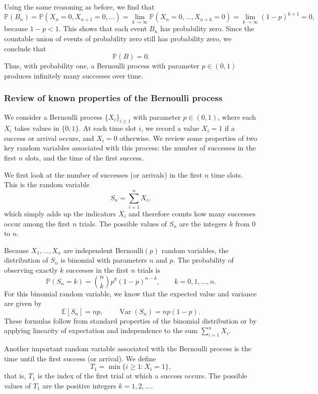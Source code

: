 Using the same reasoning as before, we find that
\[
\mathbb{P}(B_n)
=
\mathbb{P}(X_n = 0, X_{n+1} = 0, \ldots)
=
\lim_{k \to \infty} \mathbb{P}(X_n = 0, \ldots, X_{n+k} = 0)
=
\lim_{k \to \infty} (1-p)^{k+1}
=
0,
\]
because \(1-p < 1\).  
This shows that each event \(B_n\) has probability zero.  
Since the countable union of events of probability zero still has probability zero, we conclude that
\[
\mathbb{P}(B) = 0.
\]
Thus, with probability one, a Bernoulli process with parameter \(p \in (0,1)\) produces infinitely many successes over time.

\subsubsection{Review of known properties of the Bernoulli process}

We consider a Bernoulli process \(\{X_i\}_{i \geq 1}\) with parameter \(p \in (0,1)\), where each \(X_i\) takes values in \(\{0,1\}\).  
At each time slot \(i\), we record a value \(X_i = 1\) if a success or arrival occurs, and \(X_i = 0\) otherwise.  
We review some properties of two key random variables associated with this process: the number of successes in the first \(n\) slots, and the time of the first success.  

We first look at the number of successes (or arrivals) in the first \(n\) time slots.  
This is the random variable
\[
S_n = \sum_{i=1}^{n} X_i,
\]
which simply adds up the indicators \(X_i\) and therefore counts how many successes occur among the first \(n\) trials.  
The possible values of \(S_n\) are the integers \(k\) from \(0\) to \(n\).  

Because \(X_1,\ldots,X_n\) are independent Bernoulli\((p)\) random variables, the distribution of \(S_n\) is binomial with parameters \(n\) and \(p\).  
The probability of observing exactly \(k\) successes in the first \(n\) trials is
\[
\mathbb{P}(S_n = k)
=
\binom{n}{k} p^{k} (1-p)^{n-k},
\qquad
k = 0,1,\ldots,n.
\]
For this binomial random variable, we know that the expected value and variance are given by
\[
\mathbb{E}[S_n] = np,
\qquad
\operatorname{Var}(S_n) = np(1-p).
\]
These formulas follow from standard properties of the binomial distribution or by applying linearity of expectation and independence to the sum \(\sum_{i=1}^{n} X_i\).  

Another important random variable associated with the Bernoulli process is the time until the first success (or arrival).  
We define
\[
T_1 = \min\{i \geq 1 : X_i = 1\},
\]
that is, \(T_1\) is the index of the first trial at which a success occurs.  
The possible values of \(T_1\) are the positive integers \(k = 1,2,\ldots\).  

